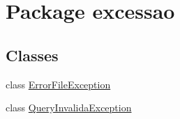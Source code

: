 \hypertarget{namespaceexcessao}{}\section{Package excessao}
\label{namespaceexcessao}
\subsection*{Classes}
\begin{DoxyCompactItemize}
\item 
class \hyperlink{classexcessao_1_1ErrorFileException}{Error\+File\+Exception}
\item 
class \hyperlink{classexcessao_1_1QueryInvalidaException}{Query\+Invalida\+Exception}
\end{DoxyCompactItemize}
